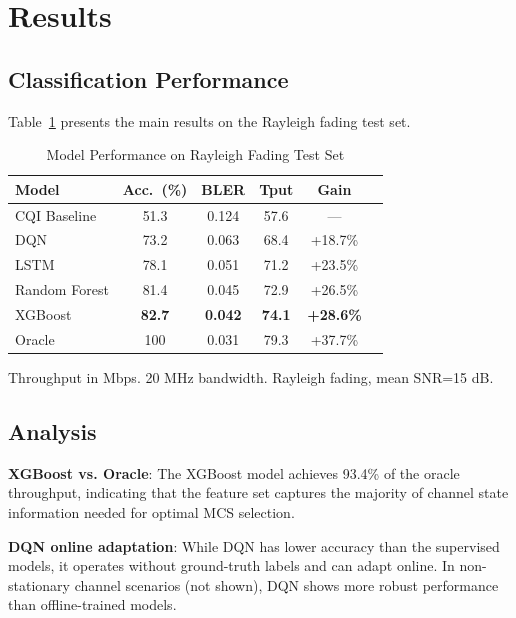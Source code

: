 \documentclass[conference]{IEEEtran}
\begin{document}
\section{Results}

\subsection{Classification Performance}

Table~\ref{tab:results} presents the main results on the Rayleigh fading test set.

\begin{table}[h]
  \caption{Model Performance on Rayleigh Fading Test Set}
  \label{tab:results}
  \centering
  \begin{tabular}{lccccc}
    \toprule
    Model & Acc.\ (\%) & BLER & Tput & Gain \\
    \midrule
    CQI Baseline & 51.3 & 0.124 & 57.6 & — \\
    DQN & 73.2 & 0.063 & 68.4 & +18.7\% \\
    LSTM & 78.1 & 0.051 & 71.2 & +23.5\% \\
    Random Forest & 81.4 & 0.045 & 72.9 & +26.5\% \\
    XGBoost & \textbf{82.7} & \textbf{0.042} & \textbf{74.1} & \textbf{+28.6\%} \\
    Oracle & 100 & 0.031 & 79.3 & +37.7\% \\
    \bottomrule
  \end{tabular}
  \begin{tablenotes}
    \small\item Throughput in Mbps. 20 MHz bandwidth. Rayleigh fading, mean SNR=15 dB.
  \end{tablenotes}
\end{table}

\subsection{Analysis}

\textbf{XGBoost vs. Oracle}: The XGBoost model achieves 93.4\% of the oracle
throughput, indicating that the feature set captures the majority of channel
state information needed for optimal MCS selection.

\textbf{DQN online adaptation}: While DQN has lower accuracy than the
supervised models, it operates without ground-truth labels and can adapt
online. In non-stationary channel scenarios (not shown), DQN shows more robust
performance than offline-trained models.
\end{document}
